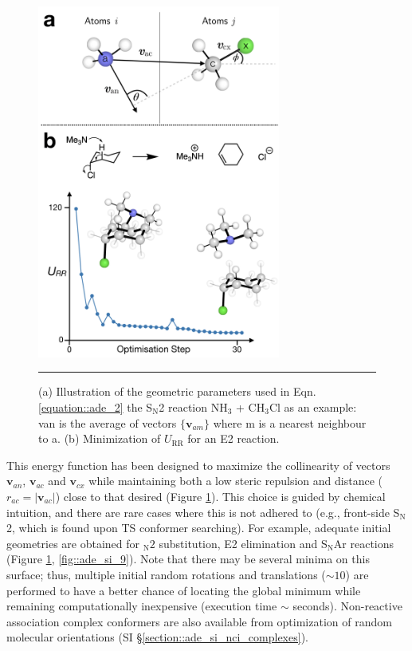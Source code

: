 \documentclass[../../main.tex]{subfiles}
\begin{document}
\begin{figure}[h!]
	\vspace{0.4cm}
	\centering
	\includegraphics[width=8cm]{5/autode/figs/fig4}
	\vspace{0.3cm}
	\hrule
	\caption{(a) Illustration of the geometric parameters used in Eqn. \eqref{equation::ade_2} the S$_\text{N}$2 reaction NH$_3$ + CH$_3$Cl as an example: van is the average of vectors $\{\boldsymbol{v}_{am}\}$ where m is a nearest neighbour to a. (b) Minimization of $U_\text{RR}$  for an E2 reaction.}
	\label{fig::ade_4}
\end{figure}

This energy function has been designed to maximize the collinearity of vectors $\boldsymbol{v}_{an}$, $\boldsymbol{v}_{ac}$ and $\boldsymbol{v}_{cx}$ while maintaining both a low steric repulsion and distance ($r_{ac} = |\boldsymbol{v}_{ac}|$) close to that desired (Figure \ref{fig::ade_4}). This choice is guided by chemical intuition, and there are rare cases where this is not adhered to (e.g., front-side S$_\text{N}$2,\cite{Hamlin2018} which is found upon TS conformer searching). For example, adequate initial geometries are obtained for ${}_\text{N}2$ substitution, E2 elimination and S$_\text{N}$Ar reactions (Figure \ref{fig::ade_4}, \ref{fig::ade_si_9}). Note that there may be several minima on this surface; thus, multiple initial random rotations and translations ($\sim 10$) are performed to have a better chance of locating the global minimum while remaining computationally inexpensive (execution time $\sim$ seconds). Non-reactive association complex conformers are also available from optimization of random molecular orientations (SI §\ref{section::ade_si_nci_complexes}).
\end{document}
